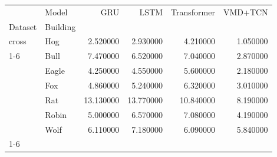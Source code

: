 \begin{tabular}{llrrrr}
\toprule
 & Model & GRU & LSTM & Transformer & VMD+TCN \\
Dataset & Building &  &  &  &  \\
\midrule
cross & Hog & 2.520000 & 2.930000 & 4.210000 & 1.050000 \\
\cline{1-6}
\multirow[t]{6}{*}{holdout} & Bull & 7.470000 & 6.520000 & 7.040000 & 2.870000 \\
 & Eagle & 4.250000 & 4.550000 & 5.600000 & 2.180000 \\
 & Fox & 4.860000 & 5.240000 & 6.320000 & 3.010000 \\
 & Rat & 13.130000 & 13.770000 & 10.840000 & 8.190000 \\
 & Robin & 5.000000 & 6.570000 & 7.080000 & 4.190000 \\
 & Wolf & 6.110000 & 7.180000 & 6.090000 & 5.840000 \\
\cline{1-6}
\bottomrule
\end{tabular}
